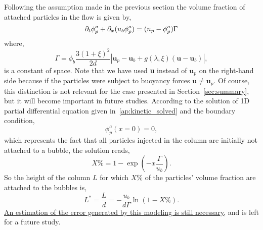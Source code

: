 Following the assumption made in the previous section the volume fraction of attached particles in the flow is given by,
\begin{equation}
    \partial_t \phi_p^a  
    + \partial_x (u_b \phi_p^a)
    =
    (n_p - \phi_p^a)\Gamma
\end{equation}
where, 
\begin{equation}
    \Gamma = \phi_b \frac{3(1+\xi)^2 }{2d}
    \left|\textbf{u}_p  - \textbf{u}_b + g(\lambda,\xi) (\textbf{u} - \textbf{u}_b)\right|,
\end{equation}
is a constant of space. 
Note that we have used \textbf{u} instead of $\textbf{u}_p$ on the right-hand side because if the particles were subject to buoyancy forces $\textbf{u}\neq\textbf{u}_p$.
Of course, this distinction is not relevant for the case presented in Section~\ref{sec:summary}, but it will become important in future studies.
According to the solution of 1D partial differential equation given in~\ref{ap:kinetic_solved} and the boundary condition,
\begin{equation}
    \phi_p^a(x=0) = 0,
\end{equation} 
which represents the fact that all particles injected in the column are initially not attached to a bubble, 
the solution reads,
\begin{equation}
    X\% =
    1-\exp\left(-x \frac{\Gamma}{u_b} \right).
\end{equation}
So the height of the column $L$ for which $X\%$ of the particles' volume fraction are attached to the bubbles is, 
\begin{equation}
    L^* = \frac{L}{d} = - \frac{u_b}{d \Gamma}
    \ln(1 - X\%). 
\end{equation}
\underline{An estimation of the error generated by this modeling is still necessary}, 
and is left for a future study.  

